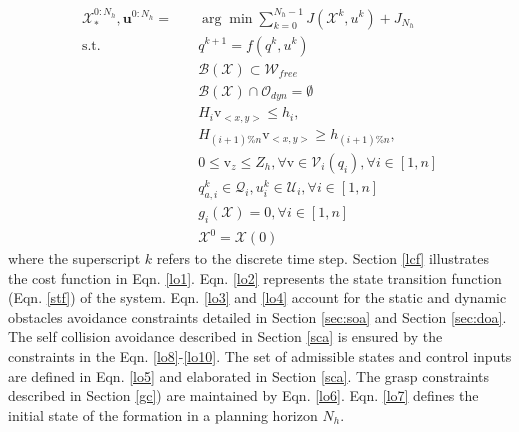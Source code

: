 \begin{subequations}\label{lo}
        \begin{align}
            \mathcal{X}^{0:N_h}_*,\mathbf{u}^{0:N_h}=\quad & \arg\min \sum_{k=0}^{N_h-1} J( \mathcal{X}^k,u^k) + J_{N_h} \label{lo1}\\
            \textrm{s.t.} \quad & q^{k+1}=f(q^k,u^k) \label{lo2}\\
            \quad & \mathcal{B}(\mathcal{X})\subset\mathcal{W}_{free} \label{lo3}\\
            \quad & \mathcal{B}(\mathcal{X}) \cap \mathcal{O}_{dyn} = \emptyset  \label{lo4} \\
            \quad & H_i\mathrm{v}_{<x,y>}\leq h_i, \label{lo8}\\
            \quad & H_{(i+1)\%n}\mathrm{v}_{<x,y>}\geq h_{(i+1)\%n}, \label{lo9}\\
            \quad & 0\leq \mathrm{v}_z\leq  Z_h ,\forall\mathrm{v}\in\mathscr{V}_i(q_i), \forall i\in [1,n] \label{lo10}\\
            \quad & q^k_{a,i} \in \mathcal{Q}_i , u^k_i \in \mathcal{U}_i, \forall i\in [1,n] \label{lo5}\\
            \quad & g_i(\mathcal{X}) = 0, \forall i\in [1,n]\label{lo6}\\ 
            \quad & \mathcal{X}^0 = \mathcal{X}(0) \label{lo7}
        \end{align}
\end{subequations}
where the superscript $k$ refers to the discrete time step. Section \ref{lcf} illustrates the cost function in Eqn. \eqref{lo1}. Eqn. \eqref{lo2} represents the state transition function (Eqn. \eqref{stf}) of the system. Eqn. \eqref{lo3} and \eqref{lo4} account for the static and dynamic obstacles avoidance constraints detailed in Section \ref{sec:soa} and Section \ref{sec:doa}. The self collision avoidance described in Section \ref{sca} is ensured by the constraints in the Eqn. \eqref{lo8}-\eqref{lo10}. The set of admissible states and control inputs are defined in Eqn. \eqref{lo5} and elaborated in Section \ref{sca}. The grasp constraints described in Section \ref{gc}) are maintained by Eqn. \eqref{lo6}. Eqn. \eqref{lo7} defines the initial state of the formation in a planning horizon $N_h$.


